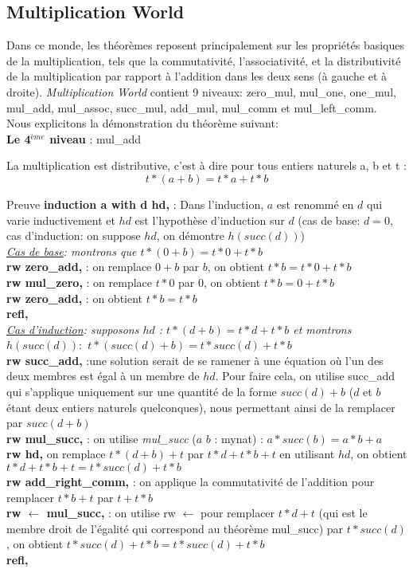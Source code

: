 \subsection{Multiplication World}
Dans ce monde, les théorèmes reposent principalement sur les propriétés basiques de la multiplication, tels que la commutativité, l'associativité, et la distributivité de la multiplication par rapport à l'addition dans les deux sens (à gauche et à droite). \textit{Multiplication World} contient 9 niveaux: zero\_mul, mul\_one, one\_mul, mul\_add, mul\_assoc, succ\_mul, add\_mul, mul\_comm et mul\_left\_comm.\\ Nous explicitons la démonstration du théorème suivant: \\
\textbf{Le 4$^{ème}$ niveau} : mul\_add  \begin{center} La multiplication est distributive, c'est à dire pour tous entiers naturels a, b et t : $$t*(a+b)=t*a+t*b$$ \end{center}
Preuve
\textbf{induction a with d hd,} : Dans l'induction, \textbf{$a$} est renommé en \textbf{$d$} qui varie inductivement et \textbf{$hd$} est l'hypothèse d'induction sur $d$ (cas de base: $d=0$, cas d'induction: on suppose $hd$, on démontre $h(succ(d))$)  \\
\textit{\underline{Cas de base}: montrons que $t * (0 + b) = t * 0 + t * b$}\\
\textbf{rw zero\_add,} : on remplace $0+b$ par $b$, on obtient $t*b=t*0+t*b$ \\
\textbf{rw mul\_zero,} : on remplace $t*0$ par $0$, on obtient $t*b=0+t*b$ \\
\textbf{rw zero\_add,} : on obtient $t*b=t*b$ \\
\textbf{refl,} \\
\textit{\underline{Cas d'induction}: supposons $hd$ : $t*(d+b) = t * d + t * b$ et montrons $h(succ(d)):$ $t * (succ (d) + b) = t * succ (d) + t * b$ }\\
\textbf{rw succ\_add,} :une solution serait de se ramener à une équation où l'un des deux membres est égal à un membre de $hd$. Pour faire cela, on utilise succ\_add qui s'applique uniquement sur une quantité de la forme $succ(d)+b$ ($d$ et $b$ étant deux entiers naturels quelconques), nous permettant ainsi de la remplacer par $succ(d+b)$\\
\textbf{rw mul\_succ,} : on utilise \textit{mul\_succ} ($a$ $b$ : mynat) : $a * succ(b) = a * b + a $\\
\textbf{rw hd,} on remplace $t * (d + b) + t$ par $t * d + t * b+t$ en utilisant $hd$, on obtient $ t * d + t * b + t = t * succ(d) + t * b$\\
\textbf{rw add\_right\_comm,} : on applique la commutativité de l'addition pour remplacer $t * b + t$ par $ t + t * b$\\
\textbf{rw $\leftarrow$  mul\_succ, }: on utilise rw $\leftarrow$ pour remplacer $t * d + t$ (qui est le membre droit de l'égalité qui correspond au théorème mul\_succ) par $t * succ (d)$, on obtient $t * succ(d) + t * b = t * succ(d) + t * b$\\
\textbf{refl,} \\
